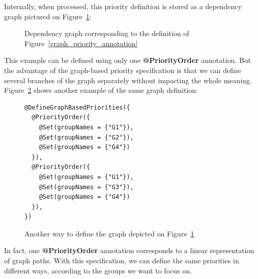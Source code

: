 \documentclass[11pt]{report}
\begin{document}
Internally, when processed, this priority definition is stored as a dependency graph pictured on Figure~\ref{fig:graph}:

\begin{figure}[!ht]
      \caption{Dependency graph corresponding to the definition of Figure~\ref{graph_priority_annotation}}
      \label{fig:graph} 
\end{figure}

This example can be defined using only one \textbf{@PriorityOrder} annotation. But the advantage of the graph-based priority specification is that we can define several branches of the graph separately without impacting the whole meaning. Figure~\ref{graph_priority_definition_2} shows another example of the same graph definition:

\begin{figure}[!ht]
	\lstset{language=java, numbers=left, numberstyle=\tiny, stepnumber=1, numbersep=5pt, basicstyle=\footnotesize}
	\begin{lstlisting}[frame=single]
@DefineGraphBasedPriorities({
  @PriorityOrder({
    @Set(groupNames = {"G1"}),
    @Set(groupNames = {"G2"}),
    @Set(groupNames = {"G4"})
  }),
  @PriorityOrder({
    @Set(groupNames = {"G1"}),
    @Set(groupNames = {"G3"}),
    @Set(groupNames = {"G4"})
  }),
})
 	\end{lstlisting}
\caption{Another way to define the graph depicted on Figure~\ref{fig:graph}}
\label{graph_priority_definition_2}
\end{figure}

In fact, one \textbf{@PriorityOrder} annotation corresponds to a linear representation of graph paths. With this specification, we can define the same priorities in different ways, according to the groups we want to focus on.
\end{document}
